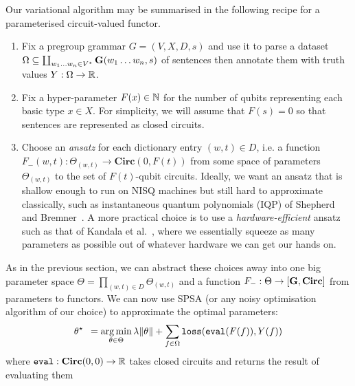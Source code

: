 Our variational algorithm may be summarised in the following recipe for a parameterised circuit-valued functor.
\begin{enumerate}
\item Fix a pregroup grammar $G = (V, X, D, s)$ and use it to parse a dataset $\Omega \subseteq \coprod_{w_1 \dots w_n \in V^\star} \mathbf{G}(w_1 \dots w_n, s)$ of sentences then annotate them with truth values $Y : \Omega \to \mathbb{R}$.
\item Fix a hyper-parameter $F(x) \in \mathbb{N}$ for the number of qubits representing each basic type $x \in X$.
For simplicity, we will assume that $F(s) = 0$ so that sentences are represented as closed circuits.
\item Choose an \emph{ansatz} for each dictionary entry $(w, t) \in D$, i.e. a function $F_-(w, t) : \Theta_{(w, t)} \to \mathbf{Circ}(0, F(t))$ from some space of parameters $\Theta_{(w, t)}$ to the set of $F(t)$-qubit circuits.
Ideally, we want an ansatz that is shallow enough to run on NISQ machines but still hard to approximate classically, such as instantaneous quantum polynomials (IQP) of Shepherd and Bremner~\cite{ShepherdBremner09}.
A more practical choice is to use a \emph{hardware-efficient} ansatz such as that of Kandala et al.~\cite{KandalaEtAl17}, where we essentially squeeze as many parameters as possible out of whatever hardware we can get our hands on.
\end{enumerate}
As in the previous section, we can abstract these choices away into one big parameter space $\Theta = \prod_{(w, t) \in D} \Theta_{(w, t)}$ and a function $F_- : \Theta \to [\mathbf{G}, \mathbf{Circ}]$ from parameters to functors.
We can now use SPSA (or any noisy optimisation algorithm of our choice) to approximate the optimal parameters:
$$\theta^\star \enspace = \operatorname*{arg\,min}_{\theta \in \Theta}
\lambda \lVert \theta \rVert + \sum_{f \in \Omega} \mathtt{loss}(\mathtt{eval}(F(f)), Y(f))$$
where $\mathtt{eval} : \mathbf{Circ}(0, 0) \to \mathbb{R}$ takes closed circuits and returns the result of evaluating them

